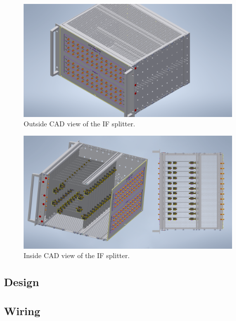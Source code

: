 \documentclass[12pt,a4paper,oneside]{article}
\begin{document}
\hfill \break

%
\begin{figure}[H]
\centering
\includegraphics[width=1\linewidth]{figures/CAD_outside.png}
\caption{Outside CAD view of the IF splitter.}
\label{fig:CAD_outside}
\end{figure}
%

%
\begin{figure}[H]
\centering
\includegraphics[width=1\linewidth]{figures/CAD_inside.png}
\caption{Inside CAD view of the IF splitter.}
\label{fig:CAD_inside}
\end{figure}
%


\subsection{Design}
\label{sec:Design}


\subsection{Wiring}
\label{sec:Wiring}
\end{document}
